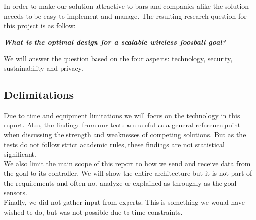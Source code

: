 In order to make our solution attractive to bars and companies alike the solution neeeds to be easy to implement and manage. The resulting research question for this project is as follow:
\begin{center}
    \textbf{\textit{What is the optimal design for a scalable wireless foosball goal?}}
\end{center}
We will answer the question based on the four aspects: technology, security, sustainability and privacy. 

\subsection{Delimitations}
Due to time and equipment limitations we will focus on the technology in this report. Also, the findings from our tests are useful as a general reference point when discussing the strength and weaknesses of competing solutions. But as the tests do not follow strict academic rules, these findings are not statistical significant. \\
We also limit the main scope of this report to how we send and receive data from the goal to its controller. We will show the entire architecture but it is not part of the requirements and often not analyze or explained as throughly as the goal sensors.\\
Finally, we did not gather input from experts. This is something we would have wished to do, but was not possible due to time constraints.